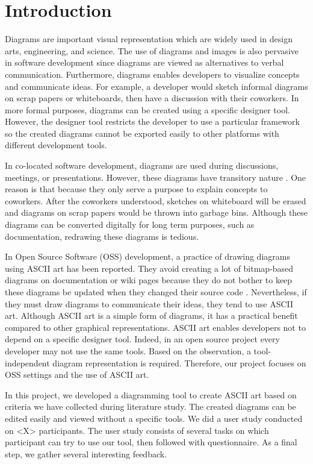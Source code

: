 \documentclass{sig-alternate}
\begin{document}

\section{Introduction}
\label{introduction}
Diagrams are important visual representation which are widely used in design arts, engineering, and science. The use of diagrams and images is also pervasive in software development since diagrams are viewed as alternatives to verbal communication. Furthermore, diagrams enables developers to visualize concepts and communicate ideas. For example, a developer would sketch informal diagrams on scrap papers or whiteboards, then have a discussion with their coworkers. In more formal purposes, diagrams can be created using a specific designer tool. However, the designer tool restricts the developer to use a particular framework so the created diagrams cannot be exported easily to other platforms with different development tools.

In co-located software development, diagrams are used during discussions, meetings, or presentations. However, these diagrams have transitory nature \cite{Cherubini2007}. One reason is that because they only serve a purpose to explain concepts to coworkers. After the coworkers understood, sketches on whiteboard will be erased and diagrams on scrap papers would be thrown into garbage bins. Although these diagrams can be converted digitally for long term purposes, such as documentation, redrawing these diagrams is tedious. 

In Open Source Software (OSS) development, a practice of drawing diagrams using ASCII art has been reported. They avoid creating a lot of bitmap-based diagrams on documentation or wiki pages because they do not bother to keep these diagrams be updated when they changed their source code \cite{Yatani2009}. Nevertheless, if they must draw diagrams to communicate their ideas, they tend to use ASCII art. Although ASCII art is a simple form of diagrams, it has a practical benefit compared to other graphical representations. ASCII art enables developers not to depend on a specific designer tool. Indeed, in an open source project every developer may not use the same tools. Based on the observation, a tool-independent diagram representation is required. Therefore, our project focuses on OSS settings and the use of ASCII art. 

In this project, we developed a diagramming tool to create ASCII art based on criteria we have collected during literature study. The created diagrams can be edited easily and viewed without a specific tools. We did a user study conducted on <X> participants. The user study consists of several tasks on which participant can try to use our tool, then followed with questionnaire. As a final step, we gather several interesting feedback.
\end{document}
